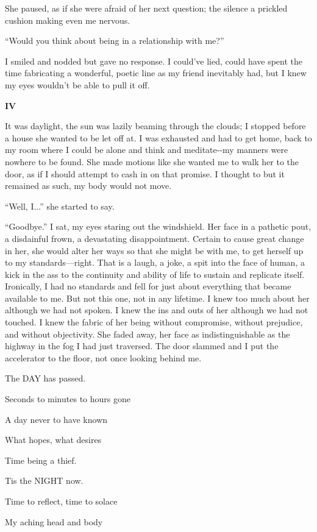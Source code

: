 She paused, as if she were afraid of her next question; the silence a
prickled cushion making even me nervous.

``Would you think about being in a relationship with me?''

I smiled and nodded but gave no response. I could've lied, could have
spent the time fabricating a wonderful, poetic line as my friend
inevitably had, but I knew my eyes wouldn't be able to pull it off.

\textbf{IV}

It was daylight, the sun was lazily beaming through the clouds; I
stopped before a house she wanted to be let off at. I was exhausted and
had to get home, back to my room where I could be alone and think and
meditate-\/-my manners were nowhere to be found. She made motions like
she wanted me to walk her to the door, as if I should attempt to cash in
on that promise. I thought to but it remained as such, my body would not
move.

``Well, I...'' she started to say.

``Goodbye.'' I sat, my eyes staring out the windshield. Her face in a
pathetic pout, a disdainful frown, a devastating disappointment. Certain
to cause great change in her, she would alter her ways so that she might
be with me, to get herself up to my standards---right. That is a laugh,
a joke, a spit into the face of human, a kick in the ass to the
continuity and ability of life to sustain and replicate itself.
Ironically, I had no standards and fell for just about everything that
became available to me. But not this one, not in any lifetime. I knew
too much about her although we had not spoken. I knew the ins and outs
of her although we had not touched. I knew the fabric of her being
without compromise, without prejudice, and without objectivity. She
faded away, her face as indistinguishable as the highway in the fog I
had just traversed. The door slammed and I put the accelerator to the
floor, not once looking behind me.

The DAY has passed.

Seconds to minutes to hours gone

A day never to have known

What hopes, what desires

Time being a thief.

Tis the NIGHT now.

Time to reflect, time to solace

My aching head and body

